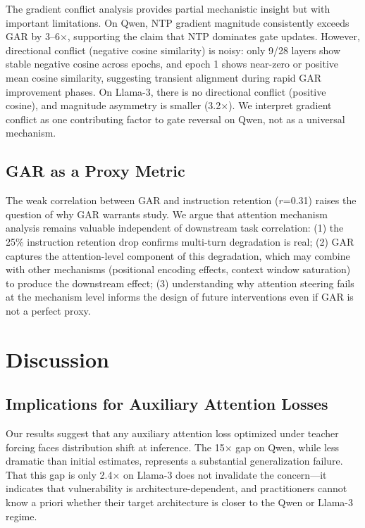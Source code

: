 \documentclass[11pt,a4paper]{article}
\begin{document}
The gradient conflict analysis provides partial mechanistic insight but with important limitations. On Qwen, NTP gradient magnitude consistently exceeds GAR by 3--6$\times$, supporting the claim that NTP dominates gate updates. However, directional conflict (negative cosine similarity) is noisy: only 9/28 layers show stable negative cosine across epochs, and epoch 1 shows near-zero or positive mean cosine similarity, suggesting transient alignment during rapid GAR improvement phases. On Llama-3, there is no directional conflict (positive cosine), and magnitude asymmetry is smaller (3.2$\times$). We interpret gradient conflict as one contributing factor to gate reversal on Qwen, not as a universal mechanism.

\subsection{GAR as a Proxy Metric}

The weak correlation between GAR and instruction retention ($r$=0.31) raises the question of why GAR warrants study. We argue that attention mechanism analysis remains valuable independent of downstream task correlation: (1) the 25\% instruction retention drop confirms multi-turn degradation is real; (2) GAR captures the attention-level component of this degradation, which may combine with other mechanisms (positional encoding effects, context window saturation) to produce the downstream effect; (3) understanding why attention steering fails at the mechanism level informs the design of future interventions even if GAR is not a perfect proxy.

\section{Discussion}

\subsection{Implications for Auxiliary Attention Losses}

Our results suggest that any auxiliary attention loss optimized under teacher forcing faces distribution shift at inference. The 15$\times$ gap on Qwen, while less dramatic than initial estimates, represents a substantial generalization failure. That this gap is only 2.4$\times$ on Llama-3 does not invalidate the concern---it indicates that vulnerability is architecture-dependent, and practitioners cannot know a priori whether their target architecture is closer to the Qwen or Llama-3 regime.
\end{document}
